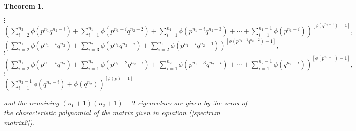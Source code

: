 \documentclass{amsart}
\theoremstyle{plain}
\newtheorem{theorem}{Theorem}[section]
\theoremstyle{definition}
\theoremstyle{remark}
\begin{document}
\begin{theorem}
\begin{center}
 $\vdots$\\
 
  $\left(\sum \limits_{i=2}^{n_2}\phi(p^{n_1}q^{n_2-i}) + \sum \limits_{i=1}^{n_1}\phi(p^{n_1-i}q^{n_2-2}) + \sum \limits_{i=1}^{n_1}\phi(p^{n_1-i}q^{n_2-3})+ \cdots + \sum \limits_{i=1}^{n_1-1}\phi(p^{n_1-i})\right) ^{[\phi(q^{n_2-1})-1]},$\\
  
  $\left(\sum \limits_{i=2}^{n_1}\phi(p^{n_1-i}q^{n_2})+ \sum \limits_{i=3}^{n_2}\phi(p^{n_1}q^{n_2-i}) + \sum \limits_{i=2}^{n_1}\phi(p^{n_1-i}q^{n_2-1})\right)^{[\phi(p^{n_1-1}q^{n_2-2})-1]},$\\
  
  $\vdots$\\
  
  
 
 $\left(\sum \limits_{i=2}^{n_1}\phi(p^{n_1-i}q^{n_2})+ \sum \limits_{i=1}^{n_2}\phi(p^{n_1-2}q^{n_2-i}) + \sum \limits_{i=1}^{n_2}\phi(p^{n_1-3}q^{n_2-i}) + \cdots + \sum \limits_{i=1}^{n_2-1}\phi(q^{n_2-i})\right)^{[\phi(p^{n_1-1})-1]},$\\
 
 $\vdots$\\
 
 $\left(\sum \limits_{i=1}^{n_2-1}\phi(q^{n_2-i}) +\phi(q^{n_2})\right)^{[\phi({p})-1]}$      
\end{center}
and the remaining $(n_1+1)(n_2+1)-2$ eigenvalues are given by the zeros of the characteristic polynomial of the matrix given in equation \rm{(\ref{spectrum matrix2}}). 
\end{theorem}
\end{document}
